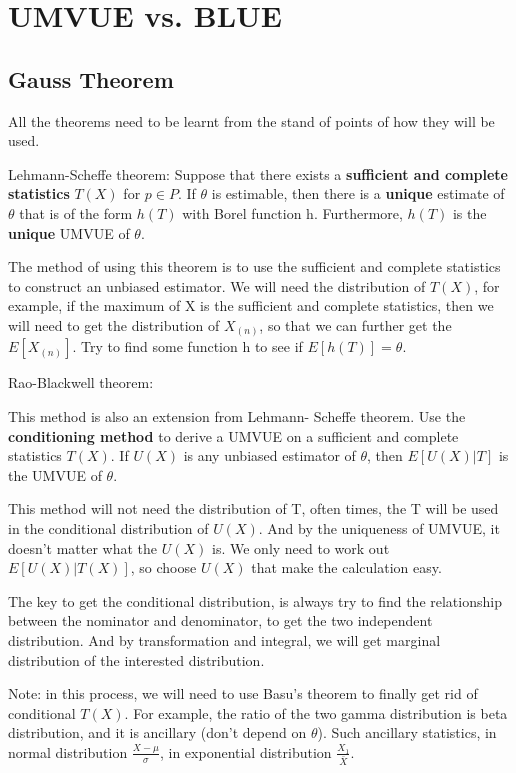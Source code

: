 \section{UMVUE vs. BLUE}

\subsection{Gauss Theorem}

All the theorems need to be learnt from the stand of points of how they will be used. 

\begin{Theorem}
Lehmann-Scheffe theorem: 
Suppose that there exists a \textbf{sufficient and complete statistics} $T(X)$ for $p \in P$. If $\theta$ is estimable, then there is a \textbf{unique} estimate of $\theta$ that is of the form $h(T)$ with Borel function h. Furthermore, $h(T)$ is the \textbf{unique} UMVUE of $\theta$. 
\end{Theorem}

The method of using this theorem is to use the sufficient and complete statistics to construct an unbiased estimator. We will need the distribution of $T(X)$, for example, if the maximum of X is the sufficient and complete statistics, then we will need to get the distribution of $X_{(n)}$, so that we can further get the $E[X_{(n)}]$. Try to find some function h to see if $E[h(T)] = \theta$.


Rao-Blackwell theorem:

This method is also an extension from Lehmann- Scheffe theorem. Use the \textbf{conditioning method} to derive a UMVUE on a sufficient and complete statistics $T(X)$. If $U(X)$ is any unbiased estimator of $\theta$, then $E[U(X)| T]$ is the UMVUE of $\theta$. 

This method will not need the distribution of T, often times, the T will be used in the conditional distribution of $U(X)$. And by the uniqueness of UMVUE, it doesn't matter what the $U(X)$ is. 
We only need to work out $E[U(X)| T(X)]$, so choose $U(X)$ that make the calculation easy. 

The key to get the conditional distribution, is always try to find the relationship between the nominator and denominator, to get the two independent distribution.
 And by transformation and integral, we will get marginal distribution of the interested distribution.

Note: in this process, we will need to use Basu's theorem to finally get rid of conditional $T(X)$. For example, the ratio of the two gamma distribution is beta distribution, and it is ancillary (don't depend on $\theta$).
Such ancillary statistics, in normal distribution $\frac{X- \mu}{\sigma}$, in exponential distribution $\frac{X_1}{\bar{X}}$. 


